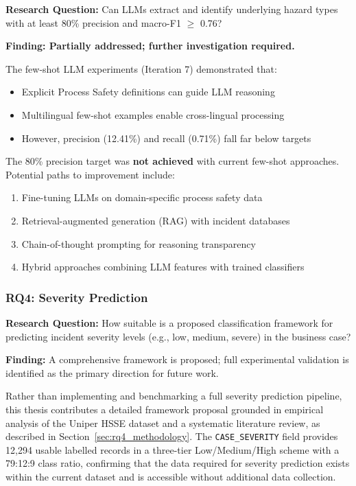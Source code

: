\documentclass[11pt, titlepage, bibliography=totoc]{scrreprt}
\begin{document}
\textbf{Research Question:} Can LLMs extract and identify underlying hazard types with at least 80\% precision and macro-F1 $\geq$ 0.76?

\textbf{Finding: Partially addressed; further investigation required.}

The few-shot LLM experiments (Iteration 7) demonstrated that:
\begin{itemize}
    \item Explicit Process Safety definitions can guide LLM reasoning
    \item Multilingual few-shot examples enable cross-lingual processing
    \item However, precision (12.41\%) and recall (0.71\%) fall far below targets
\end{itemize}

The 80\% precision target was \textbf{not achieved} with current few-shot approaches. Potential paths to improvement include:
\begin{enumerate}
    \item Fine-tuning LLMs on domain-specific process safety data
    \item Retrieval-augmented generation (RAG) with incident databases
    \item Chain-of-thought prompting for reasoning transparency
    \item Hybrid approaches combining LLM features with trained classifiers
\end{enumerate}

\subsubsection{RQ4: Severity Prediction}

\textbf{Research Question:} How suitable is a proposed classification framework for predicting incident severity levels (e.g., low, medium, severe) in the business case?

\textbf{Finding:} A comprehensive framework is proposed; full experimental validation is identified as the primary direction for future work.

Rather than implementing and benchmarking a full severity prediction pipeline, this thesis contributes a detailed framework proposal grounded in empirical analysis of the Uniper HSSE dataset and a systematic literature review, as described in Section~\ref{sec:rq4_methodology}. The \texttt{CASE\_SEVERITY} field provides 12{,}294 usable labelled records in a three-tier Low/Medium/High scheme with a 79:12:9 class ratio, confirming that the data required for severity prediction exists within the current dataset and is accessible without additional data collection.
\end{document}
